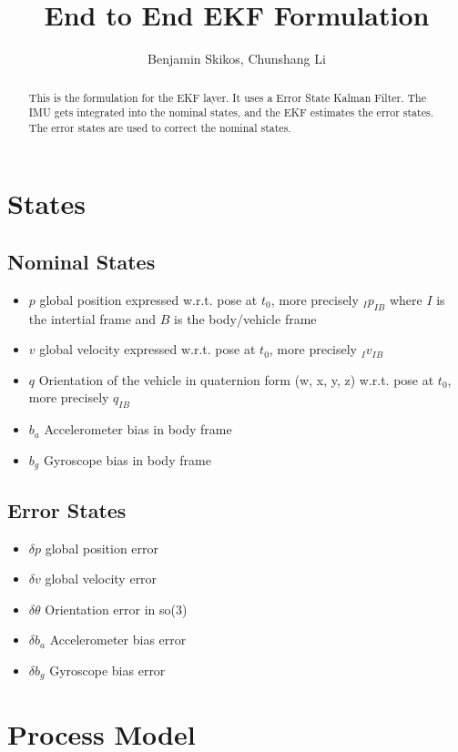 \documentclass[]{article}
\title{End to End EKF Formulation}
\author{Benjamin Skikos, Chunshang Li}
\begin{document}
\maketitle

\begin{abstract}
This is the formulation for the EKF layer. It uses a Error State Kalman Filter. The IMU gets integrated into the nominal states, and the EKF estimates the error states. The error states are used to correct the nominal states.
\end{abstract}

\section{States}

\subsection{Nominal States}

\begin{itemize}
	\item $p$ global position expressed w.r.t. pose at $t_0$, more precisely ${}_{I}{p}_{IB}$ where $I$ is the intertial frame and $B$ is the body/vehicle frame
	\item $v$ global velocity expressed w.r.t. pose at $t_0$, more precisely ${}_{I}{v}_{IB}$
	\item $q$ Orientation of the vehicle in quaternion form (w, x, y, z) w.r.t. pose at $t_0$, more precisely ${q}_{IB}$
	\item $b_a$ Accelerometer bias in body frame
	\item $b_g$ Gyroscope bias in body frame
\end{itemize}

\subsection{Error States}
\begin{itemize}
	\item $\delta p$ global position error
	\item $\delta v$ global velocity error
	\item $\delta \theta$ Orientation error in so(3)
	\item $\delta b_a$ Accelerometer bias error
	\item $\delta b_g$ Gyroscope bias error
\end{itemize}

\section{Process Model}
\end{document}
